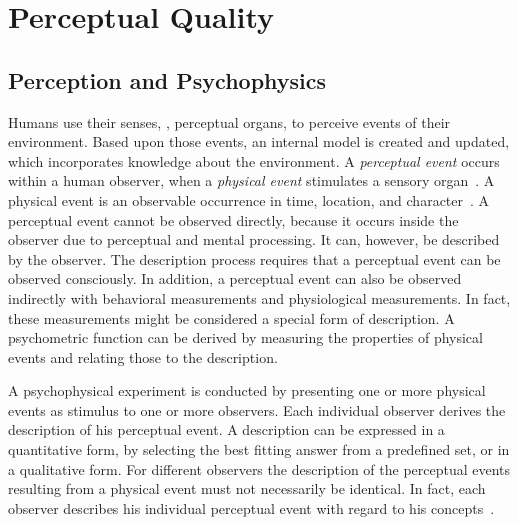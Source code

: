 \section{Perceptual Quality}
\subsection{Perception and Psychophysics}
Humans use their senses, \ie, perceptual organs, to perceive events of their environment.
Based upon those events, an internal model is created and updated, which incorporates knowledge about the environment.
A \emph{perceptual event} occurs within a human observer, when a \emph{physical event} stimulates a sensory organ~\citep[p.\,5]{blauert_spatial_1996}.
A physical event is an observable occurrence in time, location, and character~\citep{le_callet_qualinet_2013}.
A perceptual event cannot be observed directly, because it occurs inside the observer due to perceptual and mental processing.
It can, however, be described by the observer.
The description process requires that a perceptual event can be observed consciously.
In addition, a perceptual event can also be observed indirectly with behavioral measurements and physiological measurements.
In fact, these measurements might be considered a special form of description.
A psychometric function can be derived by measuring the properties of physical events and relating those to the description.

A psychophysical experiment is conducted by presenting one or more physical events as stimulus to one or more observers.
Each individual observer derives the description of his perceptual event.
A description can be expressed in a quantitative form, by selecting the best fitting answer from a predefined set, or in a qualitative form.
For different observers the description of the perceptual events resulting from a physical event must not necessarily be identical.
In fact, each observer describes his individual perceptual event with regard to his concepts~\citep[p.\,11]{blauert_spatial_1996}.

